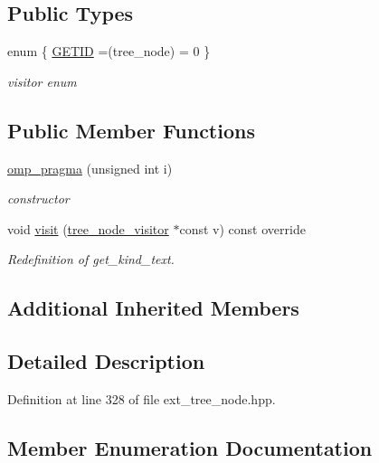 \subsection*{Public Types}
\begin{DoxyCompactItemize}
\item 
enum \{ \hyperlink{structomp__pragma_a3fbb1385b0295fc90deb053c4b16d25dafcb2946bdf8413b13ae45ee21d4d7d14}{G\+E\+T\+ID} =(tree\+\_\+node) = 0
 \}\begin{DoxyCompactList}\small\item\em visitor enum \end{DoxyCompactList}
\end{DoxyCompactItemize}
\subsection*{Public Member Functions}
\begin{DoxyCompactItemize}
\item 
\hyperlink{structomp__pragma_a43c08202d68336c34f270657d5ee0207}{omp\+\_\+pragma} (unsigned int i)
\begin{DoxyCompactList}\small\item\em constructor \end{DoxyCompactList}\item 
void \hyperlink{structomp__pragma_a2e2c445528b7e097ae76fa618a9970b5}{visit} (\hyperlink{classtree__node__visitor}{tree\+\_\+node\+\_\+visitor} $\ast$const v) const override
\begin{DoxyCompactList}\small\item\em Redefinition of get\+\_\+kind\+\_\+text. \end{DoxyCompactList}\end{DoxyCompactItemize}
\subsection*{Additional Inherited Members}


\subsection{Detailed Description}


Definition at line 328 of file ext\+\_\+tree\+\_\+node.\+hpp.



\subsection{Member Enumeration Documentation}
\mbox{\label{structomp__pragma_a3fbb1385b0295fc90deb053c4b16d25d}} 
